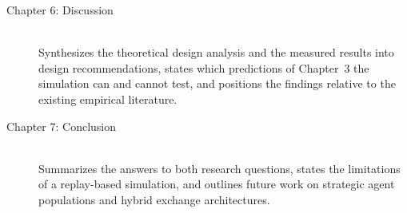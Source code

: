 \documentclass[11pt]{article}
\begin{document}
\begin{description}
    \item[Chapter 6: Discussion] \hfill \\
    Synthesizes the theoretical design analysis and the measured results into design recommendations, states which predictions of Chapter~3 the simulation can and cannot test, and positions the findings relative to the existing empirical literature.

    \item[Chapter 7: Conclusion] \hfill \\
    Summarizes the answers to both research questions, states the limitations of a replay-based simulation, and outlines future work on strategic agent populations and hybrid exchange architectures.
\end{description}
\end{document}
